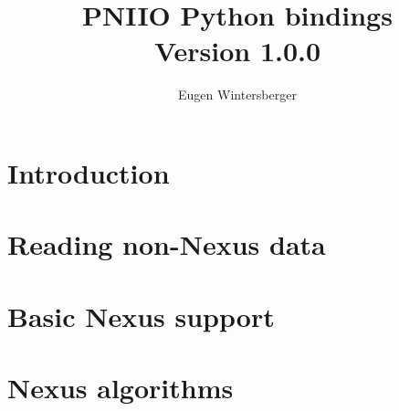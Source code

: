 \documentclass{scrbook}
\title{{\Huge PNIIO Python bindings}\\
       Version 1.0.0}
\author{Eugen Wintersberger}
\begin{document}
\maketitle
\tableofcontents
\listoftodos

\chapter{Introduction}


\chapter{Reading non-Nexus data}

\chapter{Basic Nexus support}


\chapter{Nexus algorithms}
\end{document}
